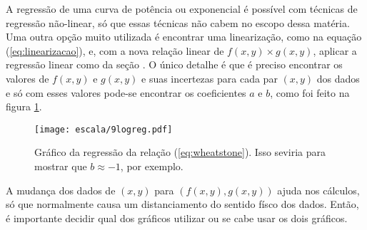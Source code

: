     A regressão de uma curva de potência ou exponencial é possível com técnicas de regressão não-linear, só que essas técnicas não cabem no escopo dessa matéria. Uma outra opção muito utilizada é encontrar uma linearização, como na equação (\ref{eq:linearizacao}), e, com a nova relação linear de $f(x, y) \times g(x, y)$, aplicar a regressão linear como da seção . O único detalhe é que é preciso encontrar os valores de $f(x, y)$ e $g(x, y)$ e suas incertezas para cada par $(x, y)$ dos dados e só com esses valores pode-se encontrar os coeficientes $a$ e $b$, como foi feito na figura \ref{fig:escala:regres}.

    \begin{figure}[htbp]
        \centering
        \texttt{[image: escala/9logreg.pdf]}

        \caption{Gráfico da regressão da relação (\ref{eq:wheatstone}). Isso seviria para mostrar que $b \approx -1$, por exemplo.}
        \label{fig:escala:regres}
    \end{figure}

    A mudança dos dados de $(x, y)$ para $(f(x, y), g(x, y))$ ajuda nos cálculos, só que normalmente causa um distanciamento do sentido físco dos dados. Então, é importante decidir qual dos gráficos utilizar ou se cabe usar os dois gráficos.
